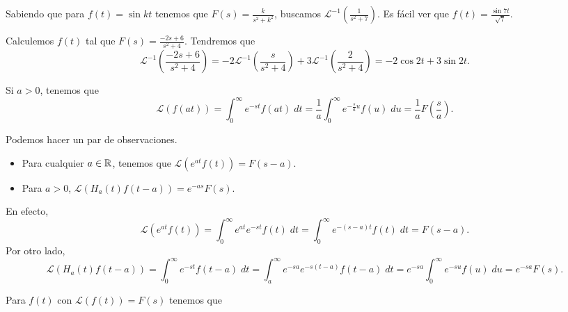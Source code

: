 \begin{eg}
Sabiendo que para $\displaystyle f\left(t\right)=\sin kt $ tenemos que $\displaystyle F\left(s\right)=\frac{k}{s^{2}+k^{2}} $, buscamos $\displaystyle \mathcal{L}^{-1}\left(\frac{1}{s^{2}+7}\right) $. Es fácil ver que $\displaystyle f\left(t\right)=\frac{\sin7t}{\sqrt{7}} $.  
\end{eg}
\begin{eg}
Calculemos $\displaystyle f\left(t\right) $ tal que $\displaystyle F\left(s\right)=\frac{-2s + 6}{s^{2}+4} $. Tendremos que 
\[\mathcal{L}^{-1} \left(\frac{-2s + 6}{s^{2}+4}\right) = - 2\mathcal{L}^{-1}\left(\frac{s}{s^{2}+4}\right)+3\mathcal{L}^{-1}\left(\frac{2}{s^{2}+4}\right)=-2\cos2t+3\sin2t.\]
\end{eg}
\begin{prop}
Si $\displaystyle a > 0 $, tenemos que 
\[\mathcal{L}\left(f\left(at\right)\right)=\int^{\infty}_{0} e^{-st}f\left(at\right) \; dt = \frac{1}{a}\int^{\infty}_{0} e^{-\frac{s}{a}u}f\left(u\right) \; du = \frac{1}{a}F\left(\frac{s}{a}\right) .\]
\end{prop}
\begin{observation}[Traslaciones]
	Podemos hacer un par de observaciones.
	\begin{itemize}
	\item Para cualquier $\displaystyle a \in \mathbb{R} $, tenemos que $\displaystyle \mathcal{L}\left(e^{at}f\left(t\right)\right)=F\left(s-a\right) $.
	\item Para $\displaystyle a > 0 $, $\displaystyle \mathcal{L}\left(H_{a}\left(t\right)f\left(t-a\right)\right)=e^{-as}F\left(s\right) $. 
	\end{itemize}
	En efecto,
	\[\mathcal{L}\left(e^{at}f\left(t\right)\right)=\int^{\infty}_{0} e^{at}e^{-st}f\left(t\right) \; dt = \int^{\infty}_{0} e^{-\left(s-a\right)t}f\left(t\right) \; dt=F\left(s-a\right) .\]
Por otro lado,
\[\mathcal{L}\left(H_{a}\left(t\right)f\left(t-a\right)\right)=\int^{\infty}_{0} e^{-st}f\left(t-a\right) \; dt=\int^{\infty}_{a} e^{-sa}e^{-s\left(t-a\right)}f\left(t-a\right) \; dt=e^{-sa}\int^{\infty}_{0} e^{-su}f\left(u\right) \; du=e^{-sa}F\left(s\right) .\]
\end{observation}
\begin{prop}[Derivación]
	Para $\displaystyle f\left(t\right) $ con $\displaystyle \mathcal{L}\left(f\left(t\right)\right)=F\left(s\right) $ tenemos que 

\end{prop}

